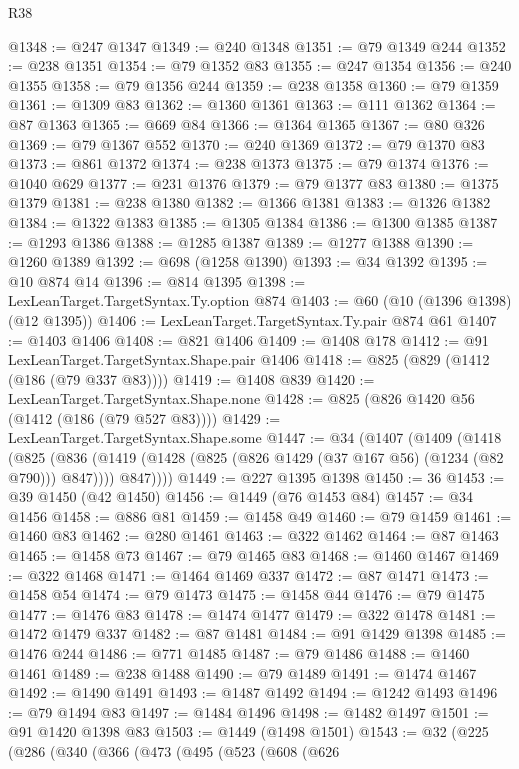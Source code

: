 \begin{lexlean}{R38}
\begin{coremodule}
@1348 := @247 @1347
@1349 := @240 @1348
@1351 := @79 @1349 @244
@1352 := @238 @1351
@1354 := @79 @1352 @83
@1355 := @247 @1354
@1356 := @240 @1355
@1358 := @79 @1356 @244
@1359 := @238 @1358
@1360 := @79 @1359
@1361 := @1309 @83
@1362 := @1360 @1361
@1363 := @111 @1362
@1364 := @87 @1363
@1365 := @669 @84
@1366 := @1364 @1365
@1367 := @80 @326
@1369 := @79 @1367 @552
@1370 := @240 @1369
@1372 := @79 @1370 @83
@1373 := @861 @1372
@1374 := @238 @1373
@1375 := @79 @1374
@1376 := @1040 @629
@1377 := @231 @1376
@1379 := @79 @1377 @83
@1380 := @1375 @1379
@1381 := @238 @1380
@1382 := @1366 @1381
@1383 := @1326 @1382
@1384 := @1322 @1383
@1385 := @1305 @1384
@1386 := @1300 @1385
@1387 := @1293 @1386
@1388 := @1285 @1387
@1389 := @1277 @1388
@1390 := @1260 @1389
@1392 := @698 (@1258 @1390)
@1393 := @34 @1392
@1395 := @10 @874 @14
@1396 := @814 @1395
@1398 := LexLeanTarget.TargetSyntax.Ty.option @874
@1403 := @60 (@10 (@1396 @1398) (@12 @1395))
@1406 := LexLeanTarget.TargetSyntax.Ty.pair @874 @61
@1407 := @1403 @1406
@1408 := @821 @1406
@1409 := @1408 @178
@1412 := @91 LexLeanTarget.TargetSyntax.Shape.pair @1406
@1418 := @825 (@829 (@1412 (@186 (@79 @337 @83))))
@1419 := @1408 @839
@1420 := LexLeanTarget.TargetSyntax.Shape.none
@1428 := @825 (@826 @1420 @56 (@1412 (@186 (@79 @527 @83))))
@1429 := LexLeanTarget.TargetSyntax.Shape.some
@1447 := @34
    (@1407
      (@1409
        (@1418
          (@825
            (@836 (@1419 (@1428 (@825 (@826 @1429 (@37 @167 @56) (@1234 (@82 @790))) @847))))
            @847))))
@1449 := @227 @1395 @1398
@1450 := 36
@1453 := @39 @1450 (@42 @1450)
@1456 := @1449 (@76 @1453 @84)
@1457 := @34 @1456
@1458 := @886 @81
@1459 := @1458 @49
@1460 := @79 @1459
@1461 := @1460 @83
@1462 := @280 @1461
@1463 := @322 @1462
@1464 := @87 @1463
@1465 := @1458 @73
@1467 := @79 @1465 @83
@1468 := @1460 @1467
@1469 := @322 @1468
@1471 := @1464 @1469 @337
@1472 := @87 @1471
@1473 := @1458 @54
@1474 := @79 @1473
@1475 := @1458 @44
@1476 := @79 @1475
@1477 := @1476 @83
@1478 := @1474 @1477
@1479 := @322 @1478
@1481 := @1472 @1479 @337
@1482 := @87 @1481
@1484 := @91 @1429 @1398
@1485 := @1476 @244
@1486 := @771 @1485
@1487 := @79 @1486
@1488 := @1460 @1461
@1489 := @238 @1488
@1490 := @79 @1489
@1491 := @1474 @1467
@1492 := @1490 @1491
@1493 := @1487 @1492
@1494 := @1242 @1493
@1496 := @79 @1494 @83
@1497 := @1484 @1496
@1498 := @1482 @1497
@1501 := @91 @1420 @1398 @83
@1503 := @1449 (@1498 @1501)
@1543 := @32
    (@225
      (@286
        (@340
          (@366
            (@473
              (@495
                (@523
                  (@608
                    (@626

\end{coremodule}
\end{lexlean}
